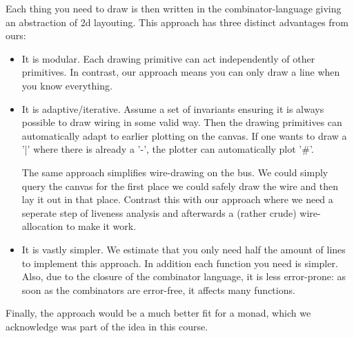 Each thing you need to draw is then written in the combinator-language
giving an abstraction of 2d layouting. This approach has three distinct
advantages from ours:
\begin{itemize}
\item It is modular. Each drawing primitive can act independently of
  other primitives. In contrast, our approach means you can only draw
  a line when you know everything.
\item It is adaptive/iterative. Assume a set of invariants
  ensuring it is always possible to draw wiring in some valid
  way. Then the drawing primitives can automatically adapt to earlier
  plotting on the canvas. If one wants to draw a '|' where there is
  already a '-', the plotter can automatically plot '\#'.

  The same approach simplifies wire-drawing on the bus. We could
  simply query the canvas for the first place we could safely draw the
  wire and then lay it out in that place. Contrast this with our
  approach where we need a seperate step of liveness analysis and
  afterwards a (rather crude) wire-allocation to make it work.
\item It is vastly simpler. We estimate that you only need half the
  amount of lines to implement this approach. In addition each
  function you need is simpler. Also, due to the closure of the
  combinator language, it is less error-prone: as soon as the
  combinators are error-free, it affects many functions.
\end{itemize}
Finally, the approach would be a much better fit for a monad, which we
acknowledge was part of the idea in this course.


